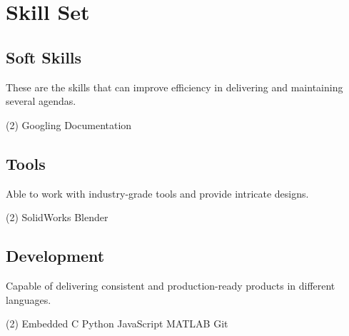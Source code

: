 \section*{Skill Set}
%
%
%
\subsection*{Soft Skills}
These are the skills that can improve efficiency in delivering and maintaining several agendas.
\smallskip
\begin{tasks}(2)
  \task Googling
  \task Documentation
\end{tasks}
%
%
\subsection*{Tools}
Able to work with industry-grade tools and provide intricate designs.
\smallskip
\begin{tasks}(2)
  \task SolidWorks
  \task Blender
\end{tasks}
%
%
\subsection*{Development}
Capable of delivering consistent and production-ready products in different languages.
\smallskip
\begin{tasks}(2)
  \task Embedded C
  \task Python
  \task JavaScript
  \task MATLAB
  \task Git
\end{tasks}

